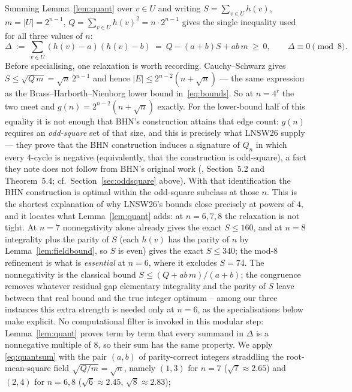 \documentclass[12pt]{article}
\begin{document}
Summing Lemma~\ref{lem:quant} over $v\in U$ and writing
$S=\sum_{v\in U}h(v)$, $m=|U|=2^{n-1}$, $Q=\sum_{v\in U}h(v)^2=n\cdot2^{n-1}$
gives the single inequality used for all three values of $n$:
\begin{equation}\label{eq:quantsum}
\Delta \ :=\ \sum_{v\in U}(h(v)-a)(h(v)-b)\ =\ Q-(a+b)S+ab\,m
\ \ge\ 0,
\qquad \Delta\equiv0\!\!\pmod 8 .
\end{equation}
Before specialising, one relaxation is worth recording. Cauchy--Schwarz gives
$S\le\sqrt{Q\,m}=\sqrt n\,2^{n-1}$ and hence
$|E|\le2^{n-2}(n+\sqrt n)$ --- the same expression as the
Brass--Harborth--Nienborg lower bound in~\eqref{eq:bounds}. So at $n=4^r$
the two meet and $g(n)=2^{n-2}(n+\sqrt n)$ exactly. For the lower-bound
half of this equality it is not enough that BHN's construction attains
that edge count: $g(n)$ requires an \emph{odd-square} set of that size,
and this is precisely what LNSW26 supply --- they prove that the BHN
construction induces a signature of $Q_n$ in which every $4$-cycle is
negative (equivalently, that the construction is odd-square), a fact they
note does not follow from BHN's original work (\cite{LNSW26},
Section~5.2 and Theorem~5.4; cf.\ Section~\ref{sec:oddsquare} above). With
that identification the BHN construction is optimal within the odd-square
subclass at those $n$. This is the shortest explanation of why
LNSW26's bounds close precisely at powers of $4$, and it locates what
Lemma~\ref{lem:quant} adds: at $n=6,7,8$ the relaxation is not tight. At
$n=7$ nonnegativity alone already gives the exact $S\le160$, and at $n=8$
integrality plus the parity of $S$ (each $h(v)$ has the parity of $n$ by
Lemma~\ref{lem:fieldbound}, so $S$ is even) gives the exact $S\le340$; the
mod-$8$ refinement is what is \emph{essential} at $n=6$, where it excludes
$S=74$.
The nonnegativity is the classical bound $S\le(Q+ab\,m)/(a+b)$; the
congruence removes whatever residual gap elementary integrality and the
parity of $S$ leave between that real bound and the true integer optimum
-- among our three instances this extra strength is needed only at $n=6$,
as the specialisations below make explicit. No computational filter is invoked in this modular
step: Lemma~\ref{lem:quant} proves term by term that every summand in
$\Delta$ is a nonnegative multiple of $8$, so their sum has the same property. We apply \eqref{eq:quantsum} with the pair
$(a,b)$ of parity-correct integers straddling the root-mean-square field
$\sqrt{Q/m}=\sqrt n$, namely $(1,3)$ for $n=7$ ($\sqrt7\approx2.65$)
and $(2,4)$ for $n=6,8$ ($\sqrt6\approx2.45$, $\sqrt8\approx2.83$);
\end{document}
